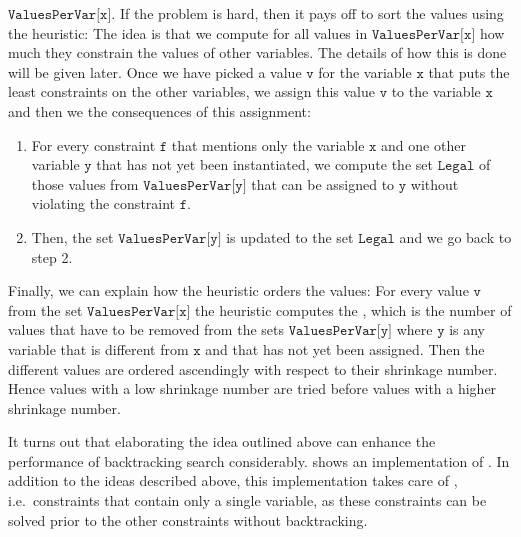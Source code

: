 \begin{enumerate}
      $\texttt{ValuesPerVar[x]}$.  If the problem is hard, then it pays off to sort the values using the
       heuristic:  The idea is that
      we compute for all values in  $\texttt{ValuesPerVar[x]}$ how much they constrain the values 
      of other variables.  The details of how this is done will be given later.  Once we have picked a value
      $\texttt{v}$ for the variable $\texttt{x}$ that puts the least constraints on the other variables, we
      assign this value $\texttt{v}$ to the variable $\texttt{x}$ and then we  the consequences of this assignment: 
      \begin{enumerate}
      \item For every constraint $\texttt{f}$ that mentions only the variable $\texttt{x}$ and one other variable
            $\texttt{y}$ that has not yet been instantiated, we compute the set $\texttt{Legal}$ of those values from 
            $\texttt{ValuesPerVar[y]}$ that can be assigned to $\texttt{y}$ without violating the constraint
            $\texttt{f}$.
            
      \item Then, the set $\texttt{ValuesPerVar[y]}$ is updated to the set $\texttt{Legal}$ and we go back to
            step 2.
      \end{enumerate}
      Finally, we can explain how the  heuristic orders the values:  For every value
      $\texttt{v}$ from the set $\texttt{ValuesPerVar[x]}$ the heuristic computes the ,
      which is the number of values that have to be removed from the sets $\texttt{ValuesPerVar[y]}$ where
      $\texttt{y}$ is any variable that is different from $\texttt{x}$ and that has not yet been assigned.
      Then the different values are ordered ascendingly with respect to their shrinkage number.  Hence values
      with a low shrinkage number are tried before values with a higher shrinkage number.
\end{enumerate}
It turns out that elaborating the idea outlined above can enhance the performance of backtracking search
considerably.   shows an implementation of 
.  In addition to the ideas described above, this implementation takes care of
, i.e.~constraints that contain only a single variable, as these constraints can be
solved prior to the other constraints without backtracking.


